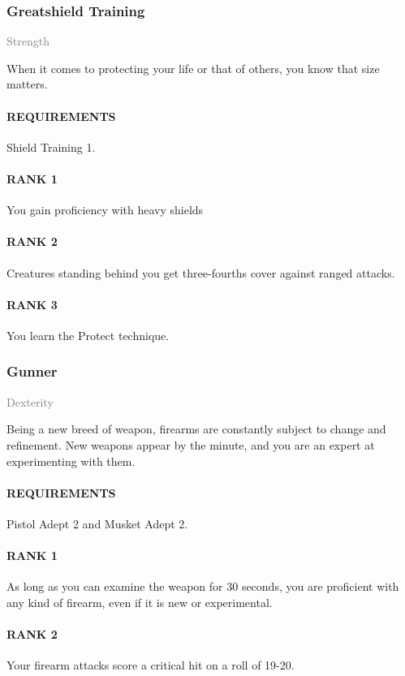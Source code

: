 \subsubsection{Greatshield Training} \label{feat::greatshieldtraining}
\small{\textcolor{gray}{Strength}}

\normalsize
When it comes to protecting your life or that of others, you know that size matters.
\paragraph{REQUIREMENTS} Shield Training 1.
\paragraph{RANK 1} You gain proficiency with heavy shields
\paragraph{RANK 2} Creatures standing behind you get three-fourths cover against ranged attacks.
\paragraph{RANK 3} You learn the Protect technique.

\subsubsection{Gunner} \label{feat::gunner}
\small{\textcolor{gray}{Dexterity}}

\normalsize
Being a new breed of weapon, firearms are constantly subject to change and refinement.
New weapons appear by the minute, and you are an expert at experimenting with them.
\paragraph{REQUIREMENTS} Pistol Adept 2 and Musket Adept 2.
\paragraph{RANK 1} As long as you can examine the weapon for 30 seconds, you are proficient with any kind of firearm, even if it is new or experimental.
\paragraph{RANK 2} Your firearm attacks score a critical hit on a roll of 19-20.
